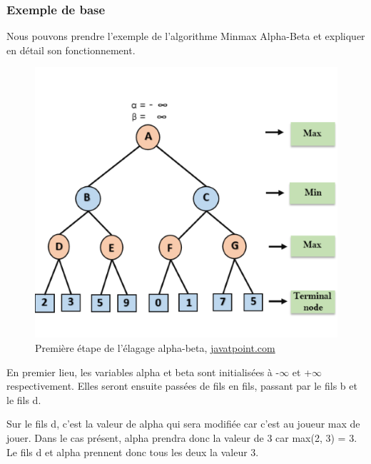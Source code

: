 \huge\documentclass{article}
\begin{document}
    \subsubsection{Exemple de base}

    Nous pouvons prendre l'exemple de l'algorithme Minmax Alpha-Beta et expliquer en détail son fonctionnement.

    \begin{figure}[h]
        \centering
        \includegraphics[scale=0.7]{img/alpha-beta-pruning-step1.png}
        \caption{Première étape de l'élagage alpha-beta,
            \href{https://www.javatpoint.com/ai-alpha-beta-pruning}{javatpoint.com}}
    \end{figure}

    En premier lieu, les variables alpha et beta sont initialisées à -$\infty$ et +$\infty$ respectivement. Elles seront ensuite passées de fils en fils, passant par le fils b et le fils d.

    Sur le fils d, c'est la valeur de alpha qui sera modifiée car c'est au joueur max de jouer. Dans le cas présent, alpha prendra donc la valeur de 3 car max(2, 3) = 3. Le fils d et alpha prennent donc tous les deux la valeur 3.
\end{document}

